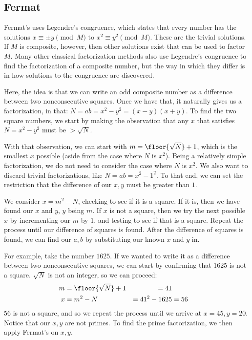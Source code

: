 \documentclass{article}
\begin{document}
\subsection{ Fermat }
\par Fermat's uses Legendre's congruence, which states that every number has the solutions
$x \equiv \pm y \pmod{M}$ to $x^2 \equiv y^2 \pmod{M}$.  These are the trivial solutions. If $M$ is composite,
however, then other solutions exist that can be used to factor $M$. Many other classical factorization methods
also use Legendre's congruence to find the factorization of a composite number, but the way in which they differ
is in how solutions to the congruence are discovered.

\par Here, the idea is that we can write an odd composite number as a difference between two nonconsecutive
squares. Once we have that, it naturally gives us a factorization, in that: $N = ab = x^2 - y^2 = (x-y)(x+y)$.
To find the two square numbers, we start by making the observation that any $x$ that satisfies $N=x^2-y^2$
must be $> \sqrt{N}$.

\par With that observation, we can start with $m=\floor{\sqrt{N}}+1$, which is the smallest $x$ possible (aside
from the case where $N$ is $x^2$). Being a relatively simple factorization, we do not need to consider the case
where $N$ is $x^2$. We also want to discard trivial factorizations, like $N = ab = x^2 - 1^2$. To that end, we
can set the restriction that the difference of our $x,y$ must be greater than $1$.

\par We consider $x=m^2-N$, checking to see if it is a square. If it is, then we have found our $x$ and $y$, $y$
being $m$. If $x$ is not a square, then we try the next possible $x$ by incrementing our $m$ by $1$, and testing to see
if that is a square. Repeat the process until our difference of squares is found. After the difference of squares
is found, we can find our $a,b$ by substituting our known $x$ and $y$ in.

\par For example, take the number $1625$. If we wanted to write it as a difference between two nonconsecutive squares,
we can start by confirming that $1625$ is not a square. $\sqrt{N}$ is not an integer, so we can proceed:
\begin{align*}
    m &= \floor{\sqrt{N}}+1 &= 41 \\
    x &= m^2-N &= 41^2 - 1625 &= 56
\end{align*}
$56$ is not a square, and so we repeat the process until we arrive at $x = 45, y = 20$. Notice that our $x,y$ are
not primes. To find the prime factorization, we then apply Fermat's on $x,y$.
\end{document}
